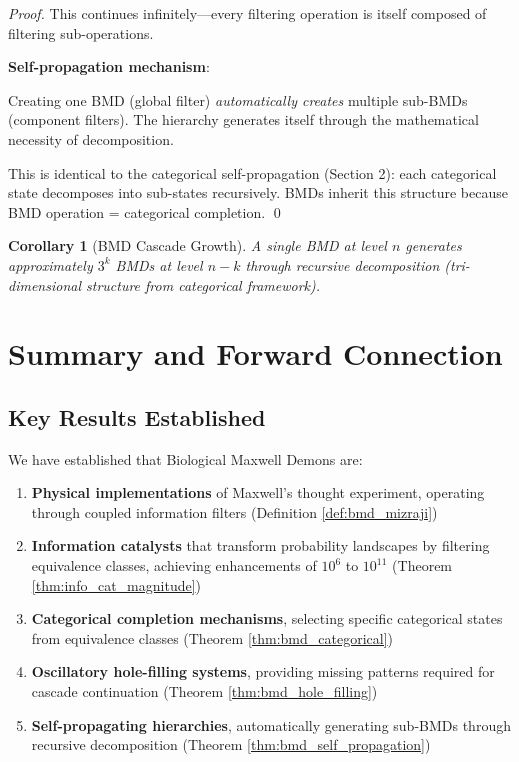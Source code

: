 \documentclass[12pt,a4paper]{article}
\newtheorem{corollary}{Corollary}
\begin{document}
\begin{proof}
This continues infinitely—every filtering operation is itself composed of filtering sub-operations.

\textbf{Self-propagation mechanism}:

Creating one BMD (global filter) \textit{automatically creates} multiple sub-BMDs (component filters). The hierarchy generates itself through the mathematical necessity of decomposition.

This is identical to the categorical self-propagation (Section 2): each categorical state decomposes into sub-states recursively. BMDs inherit this structure because BMD operation = categorical completion. \qed
\end{proof}

\begin{corollary}[BMD Cascade Growth]
\label{cor:bmd_cascade_growth}
A single BMD at level $n$ generates approximately $3^k$ BMDs at level $n-k$ through recursive decomposition (tri-dimensional structure from categorical framework).
\end{corollary}

\section{Summary and Forward Connection}

\subsection{Key Results Established}

We have established that Biological Maxwell Demons are:

\begin{enumerate}
\item \textbf{Physical implementations} of Maxwell's thought experiment, operating through coupled information filters (Definition \ref{def:bmd_mizraji})

\item \textbf{Information catalysts} that transform probability landscapes by filtering equivalence classes, achieving enhancements of $10^6$ to $10^{11}$ (Theorem \ref{thm:info_cat_magnitude})

\item \textbf{Categorical completion mechanisms}, selecting specific categorical states from equivalence classes (Theorem \ref{thm:bmd_categorical})

\item \textbf{Oscillatory hole-filling systems}, providing missing patterns required for cascade continuation (Theorem \ref{thm:bmd_hole_filling})

\item \textbf{Self-propagating hierarchies}, automatically generating sub-BMDs through recursive decomposition (Theorem \ref{thm:bmd_self_propagation})
\end{enumerate}
\end{document}
